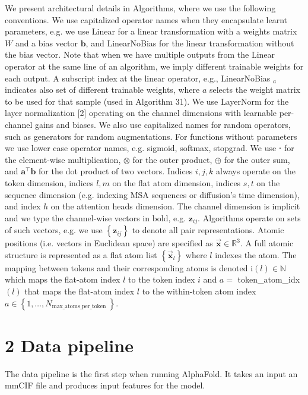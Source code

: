 \documentclass[10pt]{article}
\begin{document}
We present architectural details in Algorithms, where we use the following conventions. We use capitalized operator names when they encapsulate learnt parameters, e.g. we use Linear for a linear transformation with a weights matrix $W$ and a bias vector $\mathbf{b}$, and LinearNoBias for the linear transformation without the bias vector. Note that when we have multiple outputs from the Linear operator at the same line of an algorithm, we imply different trainable weights for each output. A subscript index at the linear operator, e.g., LinearNoBias ${ }_{a}$ indicates also set of different trainable weights, where $a$ selects the weight matrix to be used for that sample (used in Algorithm 31). We use LayerNorm for the layer normalization [2] operating on the channel dimensions with learnable per-channel gains and biases. We also use capitalized names for random operators, such as generators for random augmentations. For functions without parameters we use lower case operator names, e.g. sigmoid, softmax, stopgrad. We use ⋅ for the element-wise multiplication, $\otimes$ for the outer product, $\oplus$ for the outer sum, and $\mathbf{a}^{\top} \mathbf{b}$ for the dot product of two vectors. Indices $i, j, k$ always operate on the token dimension, indices $l, m$ on the flat atom dimension, indices $s, t$ on the sequence dimension (e.g. indexing MSA sequences or diffusion's time dimension), and index $h$ on the attention heads dimension. The channel dimension is implicit and we type the channel-wise vectors in bold, e.g. $\mathbf{z}_{i j}$. Algorithms operate on sets of such vectors, e.g. we use $\left\{\mathbf{z}_{i j}\right\}$ to denote all pair representations. Atomic positions (i.e. vectors in Euclidean space) are specified as $\overrightarrow{\mathbf{x}} \in \mathbb{R}^{3}$. A full atomic structure is represented as a flat atom list $\left\{\overrightarrow{\mathbf{x}}_{l}\right\}$ where $l$ indexes the atom. The mapping between tokens and their corresponding atoms is denoted $\mathrm{i}(l) \in \mathbb{N}$ which maps the flat-atom index $l$ to the token index $i$ and $a=$ token\_atom\_idx $(l)$ that maps the flat-atom index $l$ to the within-token atom index $a \in\left\{1, \ldots, N_{\text {max_atoms_per_token }}\right\}$.

\section*{2 Data pipeline}
The data pipeline is the first step when running AlphaFold. It takes an input an mmCIF file and produces input features for the model.
\end{document}
